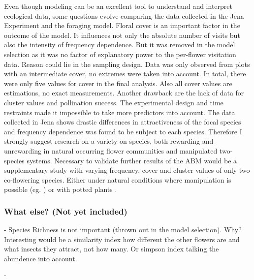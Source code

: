 Even though modeling can be an excellent tool to understand and interpret ecological data, some questions evolve comparing the data collected in the Jena Experiment and the foraging model.
Floral cover is an important factor in the outcome of the model. It influences not only the absolute number of visits but also the intensity of frequency dependence. But it was removed in the model selection as it was no factor of explanatory power to the per-flower visitation data. 
Reason could lie in the sampling design. Data was only observed from plots with an intermediate cover, no extremes were taken into account. In total, there were only five values for cover in the final analysis. Also all cover values are estimations, no exact measurements. Another drawback are the lack of data for cluster values and pollination success. The experimental design and time restraints made it impossible to take more predictors into account. The data collected in Jena shows drastic differences in attractiveness of the focal species and frequency dependence was found to be subject to each species. Therefore I strongly suggest research on a variety on species, both rewarding and unrewarding in natural occurring flower communities and manipulated two-species systems. 
Necessary to validate further results of the ABM would be a supplementary study with varying frequency, cover and cluster values of only two co-flowering species. Either under natural conditions where manipulation is possible (eg. \citealt{Eckhart2006frequency,essenberg2012explaining}) or with potted plants \citep{epperson1987frequency}. 


\subsubsection*{What else? (Not yet included)}

- Species Richness is not important (thrown out in the model selection). Why? 
Interesting would be a similarity index how different the other flowers are and what insects they attract, not how many. Or simpson index talking the abundence into account. 

- 
